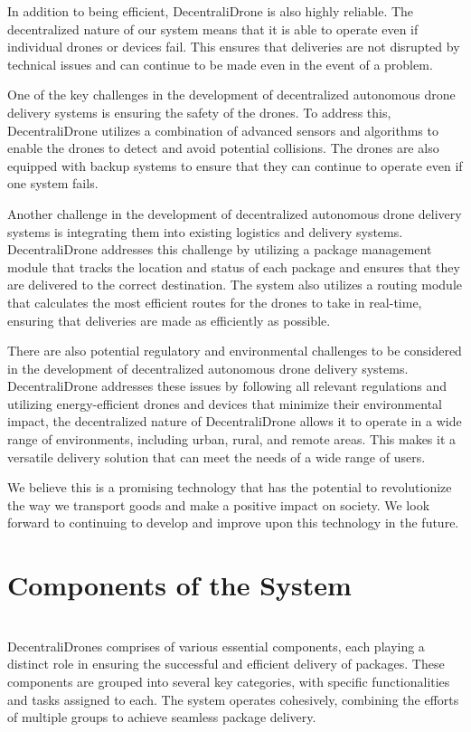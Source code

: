 \documentclass[preprint,12pt]{elsarticle}
\begin{document}
In addition to being efficient, DecentraliDrone is also highly reliable. The decentralized nature of our system means that it is able to operate even if individual drones or devices fail. This ensures that deliveries are not disrupted by technical issues and can continue to be made even in the event of a problem.

One of the key challenges in the development of decentralized autonomous drone delivery systems is ensuring the safety of the drones. To address this, DecentraliDrone utilizes a combination of advanced sensors and algorithms to enable the drones to detect and avoid potential collisions. The drones are also equipped with backup systems to ensure that they can continue to operate even if one system fails.

Another challenge in the development of decentralized autonomous drone delivery systems is integrating them into existing logistics and delivery systems. DecentraliDrone addresses this challenge by utilizing a package management module that tracks the location and status of each package and ensures that they are delivered to the correct destination. The system also utilizes a routing module that calculates the most efficient routes for the drones to take in real-time, ensuring that deliveries are made as efficiently as possible.

There are also potential regulatory and environmental challenges to be considered in the development of decentralized autonomous drone delivery systems. DecentraliDrone addresses these issues by following all relevant regulations and utilizing energy-efficient drones and devices that minimize their environmental impact, the decentralized nature of DecentraliDrone allows it to operate in a wide range of environments, including urban, rural, and remote areas. This makes it a versatile delivery solution that can meet the needs of a wide range of users.

We believe this is a promising technology that has the potential to revolutionize the way we transport goods and make a positive impact on society. We look forward to continuing to develop and improve upon this technology in the future.

\section{Components of the System}\\

DecentraliDrones comprises of various essential components, each playing a distinct role in ensuring the successful and efficient delivery of packages. These components are grouped into several key categories, with specific functionalities and tasks assigned to each. The system operates cohesively, combining the efforts of multiple groups to achieve seamless package delivery.
\end{document}
